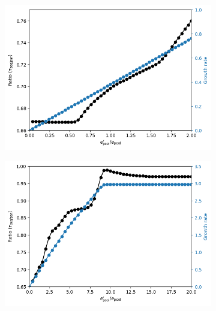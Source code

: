\begin{figure}
  \centering
  \begin{subfigure}[htpb]{0.45\textwidth}
   \centering
   \includegraphics[width=\textwidth]{epool_ec_ratio_gr}
   \caption{
   }
   \label{fig:model-pool-ratio-growthrate}
  \end{subfigure}%
  \begin{subfigure}[htpb]{0.45\textwidth}
   \centering
   \includegraphics[width=\textwidth]{epool_ec_ratio_gr_20}
   \caption{
   }
   \label{fig:model-pool-ratio-growthrate-20}
  \end{subfigure}


\end{figure}
